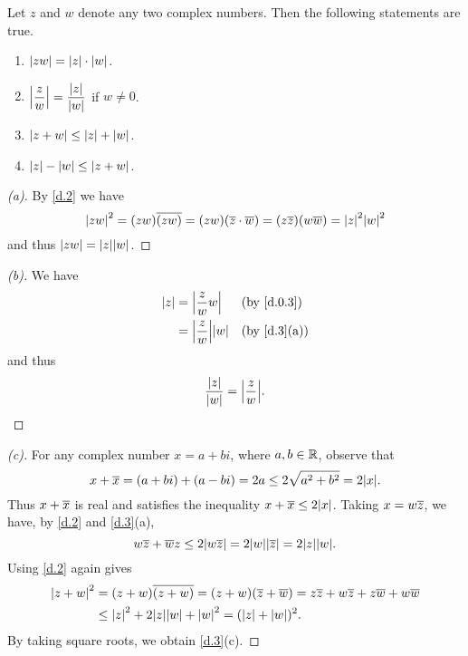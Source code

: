 \begin{thm}\label{d.3}
  Let \(z\) and \(w\) denote any two complex numbers.
  Then the following statements are true.
  \begin{enumerate}
    \item \(\left\lvert zw\right\rvert = \left\lvert z\right\rvert \cdot \left\lvert w\right\rvert\).
    \item \(\left\lvert\dfrac{z}{w}\right\rvert = \dfrac{\left\lvert z\right\rvert}{\left\lvert w\right\rvert}\) if \(w \neq 0\).
    \item \(\left\lvert z + w\right\rvert \leq \left\lvert z\right\rvert + \left\lvert w\right\rvert\).
    \item \(\left\lvert z\right\rvert - \left\lvert w\right\rvert \leq \left\lvert z + w\right\rvert\).
  \end{enumerate}
\end{thm}

\begin{proof}[(a)]
  By \cref{d.2} we have
  \[
    \abs{zw}^2 = (zw) \conj{(zw)} = (zw) (\conj{z} \cdot \conj{w}) = (z \conj{z}) (w \conj{w}) = \abs{z}^2 \abs{w}^2
  \]
  and thus \(\abs{zw} = \abs{z} \abs{w}\).
\end{proof}

\begin{proof}[(b)]
  We have
  \begin{align*}
    \abs{z} & = \abs{\dfrac{z}{w} w}       &  & \by{d.0.3}  \\
            & = \abs{\dfrac{z}{w}} \abs{w} &  & \by{d.3}[a]
  \end{align*}
  and thus
  \[
    \dfrac{\abs{z}}{\abs{w}} = \abs{\dfrac{z}{w}}.
  \]
\end{proof}

\begin{proof}[(c)]
  For any complex number \(x = a + bi\), where \(a, b \in \mathbb{R}\), observe that
  \[
    x + \conj{x} = (a + bi) + (a - bi) = 2a \leq 2 \sqrt{a^2 + b^2} = 2 \abs{x}.
  \]
  Thus \(x + \overline{x}\) is real and satisfies the inequality \(x + \conj{x} \leq 2 \abs{x}\).
  Taking \(x = w \overline{z}\), we have, by \cref{d.2} and \cref{d.3}(a),
  \[
    w \conj{z} + \conj{w} z \leq 2 \abs{w \conj{z}} = 2 \abs{w} \abs{\conj{z}} = 2 \abs{z} \abs{w}.
  \]
  Using \cref{d.2} again gives
  \begin{align*}
    \abs{z + w}^2 & = (z + w) \conj{(z + w)} = (z + w) (\conj{z} + \conj{w}) = z \conj{z} + w \conj{z} + z \conj{w} + w \conj{w} \\
                  & \leq \abs{z}^2 + 2 \abs{z} \abs{w} + \abs{w}^2 = (\abs{z} + \abs{w})^2.
  \end{align*}
  By taking square roots, we obtain \cref{d.3}(c).
\end{proof}

